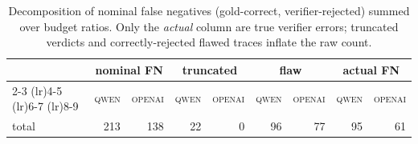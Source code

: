 \begin{table}[t]
\centering
\caption{Decomposition of nominal false negatives (gold-correct, verifier-rejected) summed over budget ratios. Only the \emph{actual} column are true verifier errors; truncated verdicts and correctly-rejected flawed traces inflate the raw count.}
\label{tab:fn_correction}
\begin{tabular}{l*{8}{r}}
\toprule
 & \multicolumn{2}{c}{nominal FN} & \multicolumn{2}{c}{truncated} & \multicolumn{2}{c}{flaw} & \multicolumn{2}{c}{actual FN} \\
\cmidrule(lr){2-3} \cmidrule(lr){4-5} \cmidrule(lr){6-7} \cmidrule(lr){8-9}
 & \textsc{qwen} & \textsc{openai} & \textsc{qwen} & \textsc{openai} & \textsc{qwen} & \textsc{openai} & \textsc{qwen} & \textsc{openai} \\
\midrule
total & 213 & 138 & 22 & 0 & 96 & 77 & 95 & 61 \\
\bottomrule
\end{tabular}
\end{table}
